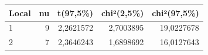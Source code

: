 \begin{tabular}{lrrrr}
\toprule
Local & nu & t(97,5\%) & chi²(2,5\%) & chi²(97,5\%) \\
\midrule
1 & 9 & 2,2621572 & 2,7003895 & 19,0227678 \\
2 & 7 & 2,3646243 & 1,6898692 & 16,0127643 \\
\bottomrule
\end{tabular}
